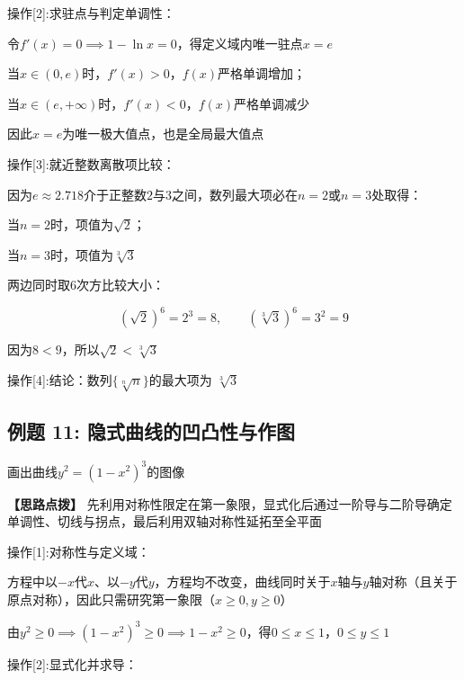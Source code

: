 \documentclass[11pt,a4paper,UTF8]{ctexart}
\begin{document}
操作[2]:求驻点与判定单调性：

\begin{solbox}[分步推导与答题规范]
令$f'(x) = 0 \implies 1 - \ln x = 0$，得定义域内唯一驻点$x = e$

当$x \in (0, e)$时，$f'(x) > 0$，$f(x)$严格单调增加；

当$x \in (e, +\infty)$时，$f'(x) < 0$，$f(x)$严格单调减少

因此$x = e$为唯一极大值点，也是全局最大值点
\end{solbox}

操作[3]:就近整数离散项比较：

\begin{solbox}[分步推导与答题规范]
因为$e \approx 2.718$介于正整数$2$与$3$之间，数列最大项必在$n = 2$或$n = 3$处取得：

当$n = 2$时，项值为$\sqrt{2}$；

当$n = 3$时，项值为$\sqrt[3]{3}$

两边同时取$6$次方比较大小：


\begin{equation*}
(\sqrt{2})^6 = 2^3 = 8, \qquad (\sqrt[3]{3})^6 = 3^2 = 9
\end{equation*}


因为$8 < 9$，所以$\sqrt{2} < \sqrt[3]{3}$
\end{solbox}

操作[4]:结论：数列$\{\sqrt[n]{n}\}$的最大项为 \textit{}$\sqrt[3]{3}$\textit{}


\subsection{例题 11: 隐式曲线的凹凸性与作图}

画出曲线$y^2 = (1 - x^2)^3$的图像

\textbf{\color{DeepPurple}【思路点拨】} 先利用对称性限定在第一象限，显式化后通过一阶导与二阶导确定单调性、切线与拐点，最后利用双轴对称性延拓至全平面


操作[1]:对称性与定义域：

\begin{solbox}[分步推导与答题规范]
方程中以$-x$代$x$、以$-y$代$y$，方程均不改变，曲线同时关于$x$轴与$y$轴对称（且关于原点对称），因此只需研究第一象限（$x \ge 0, y \ge 0$）

由$y^2 \ge 0 \implies (1 - x^2)^3 \ge 0 \implies 1 - x^2 \ge 0$，得$0 \le x \le 1$，$0 \le y \le 1$
\end{solbox}

操作[2]:显式化并求导：
\end{document}
